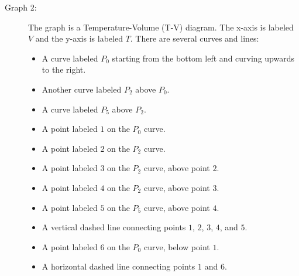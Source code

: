 \begin{description}
    \item[Graph 2:] The graph is a Temperature-Volume (T-V) diagram. The x-axis is labeled $V$ and the y-axis is labeled $T$. There are several curves and lines:
    \begin{itemize}
        \item A curve labeled $P_0$ starting from the bottom left and curving upwards to the right.
        \item Another curve labeled $P_2$ above $P_0$.
        \item A curve labeled $P_5$ above $P_2$.
        \item A point labeled $1$ on the $P_0$ curve.
        \item A point labeled $2$ on the $P_2$ curve.
        \item A point labeled $3$ on the $P_2$ curve, above point $2$.
        \item A point labeled $4$ on the $P_2$ curve, above point $3$.
        \item A point labeled $5$ on the $P_5$ curve, above point $4$.
        \item A vertical dashed line connecting points $1$, $2$, $3$, $4$, and $5$.
        \item A point labeled $6$ on the $P_0$ curve, below point $1$.
        \item A horizontal dashed line connecting points $1$ and $6$.
    \end{itemize}
\end{description}